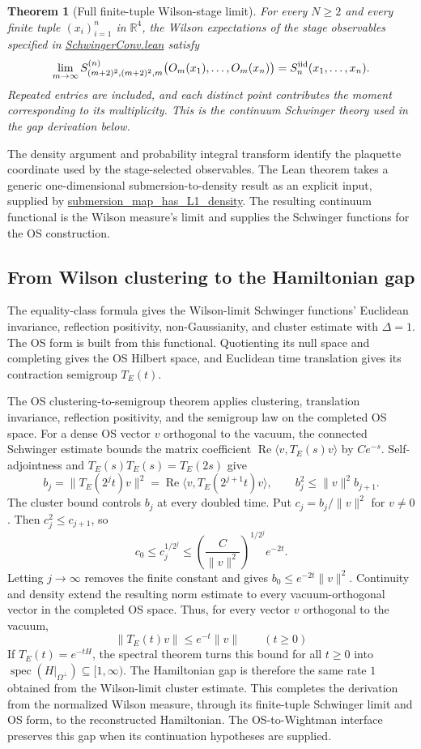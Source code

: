 \documentclass[11pt]{article}
\numberwithin{equation}{section}
\newtheorem{theorem}{Theorem}[section]
\newcommand{\Sch}{S}
\newcommand{\R}{\mathbb{R}}
\newcommand{\Lean}[1]{\url{#1}}
\begin{document}
\begin{theorem}[Full finite-tuple Wilson-stage limit]
For every \(N\geq2\) and every finite tuple \((x_i)_{i=1}^n\) in \(\R^4\), the Wilson expectations of the stage observables specified in \Lean{SchwingerConv.lean} satisfy
\[
 \lim_{m\to\infty}
 \Sch^{(n)}_{(m+2)^2,(m+2)^2,m}
      \bigl(O_m(x_1),\ldots,O_m(x_n)\bigr)
 = S_n^{\rm iid}(x_1,\ldots,x_n).
\]
Repeated entries are included, and each distinct point contributes the moment corresponding to its multiplicity. This is the continuum Schwinger theory used in the gap derivation below.
\end{theorem}

The density argument and probability integral transform identify the plaquette coordinate used by the stage-selected observables. The Lean theorem takes a generic one-dimensional submersion-to-density result as an explicit input, supplied by \Lean{submersion_map_has_L1_density}. The resulting continuum functional is the Wilson measure's limit and supplies the Schwinger functions for the OS construction.

\subsection{From Wilson clustering to the Hamiltonian gap}

The equality-class formula gives the Wilson-limit Schwinger functions' Euclidean invariance, reflection positivity, non-Gaussianity, and cluster estimate with \(\Delta=1\). The OS form is built from this functional. Quotienting its null space and completing gives the OS Hilbert space, and Euclidean time translation gives its contraction semigroup \(T_E(t)\).

The OS clustering-to-semigroup theorem applies clustering, translation invariance, reflection positivity, and the semigroup law on the completed OS space. For a dense OS vector \(v\) orthogonal to the vacuum, the connected Schwinger estimate bounds the matrix coefficient \(\operatorname{Re}\langle v,T_E(s)v\rangle\) by \(C e^{-s}\). Self-adjointness and \(T_E(s)T_E(s)=T_E(2s)\) give
\[
 b_j=\|T_E(2^j t)v\|^2
   =\operatorname{Re}\langle v,T_E(2^{j+1}t)v\rangle,
 \qquad
 b_j^2\leq \|v\|^2 b_{j+1}.
\]
The cluster bound controls \(b_j\) at every doubled time. Put \(c_j=b_j/\|v\|^2\) for \(v\ne0\). Then \(c_j^2\leq c_{j+1}\), so
\[
  c_0\leq c_j^{1/2^j}
  \leq \left(\frac{C}{\|v\|^2}\right)^{1/2^j}e^{-2t}.
\]
Letting \(j\to\infty\) removes the finite constant and gives \(b_0\leq e^{-2t}\|v\|^2\). Continuity and density extend the resulting norm estimate to every vacuum-orthogonal vector in the completed OS space. Thus, for every vector \(v\) orthogonal to the vacuum,
\[
  \|T_E(t)v\|\leq e^{-t}\|v\|\qquad(t\geq0)
\]
If \(T_E(t)=e^{-tH}\), the spectral theorem turns this bound for all \(t\geq0\) into \(\operatorname{spec}(H|_{\Omega^\perp})\subseteq[1,\infty)\). The Hamiltonian gap is therefore the same rate \(1\) obtained from the Wilson-limit cluster estimate. This completes the derivation from the normalized Wilson measure, through its finite-tuple Schwinger limit and OS form, to the reconstructed Hamiltonian. The OS-to-Wightman interface preserves this gap when its continuation hypotheses are supplied.
\end{document}
